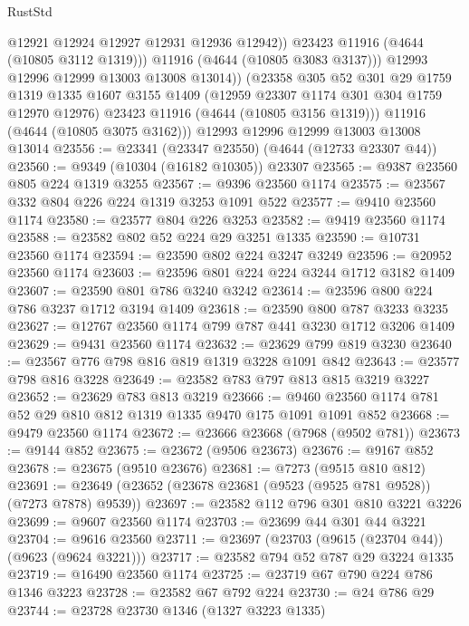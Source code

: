 \begin{lexlean}{RustStd}
\begin{coremodule}
                  @12921
                  @12924
                  @12927
                  @12931
                  @12936
                  @12942))
              @23423
              @11916
              (@4644 (@10805 @3112 @1319)))
            @11916
            (@4644 (@10805 @3083 @3137)))
          @12993
          @12996
          @12999
          @13003
          @13008
          @13014))
      (@23358
        @305
        @52
        @301
        @29
        @1759
        @1319
        @1335
        @1607
        @3155
        @1409
        (@12959 @23307 @1174 @301 @304 @1759 @12970 @12976)
        @23423
        @11916
        (@4644 (@10805 @3156 @1319)))
      @11916
      (@4644 (@10805 @3075 @3162)))
    @12993
    @12996
    @12999
    @13003
    @13008
    @13014
@23556 := @23341 (@23347 @23550) (@4644 (@12733 @23307 @44))
@23560 := @9349 (@10304 (@16182 @10305)) @23307
@23565 := @9387 @23560 @805 @224 @1319 @3255
@23567 := @9396 @23560 @1174
@23575 := @23567 @332 @804 @226 @224 @1319 @3253 @1091 @522
@23577 := @9410 @23560 @1174
@23580 := @23577 @804 @226 @3253
@23582 := @9419 @23560 @1174
@23588 := @23582 @802 @52 @224 @29 @3251 @1335
@23590 := @10731 @23560 @1174
@23594 := @23590 @802 @224 @3247 @3249
@23596 := @20952 @23560 @1174
@23603 := @23596 @801 @224 @224 @3244 @1712 @3182 @1409
@23607 := @23590 @801 @786 @3240 @3242
@23614 := @23596 @800 @224 @786 @3237 @1712 @3194 @1409
@23618 := @23590 @800 @787 @3233 @3235
@23627 := @12767 @23560 @1174 @799 @787 @441 @3230 @1712 @3206 @1409
@23629 := @9431 @23560 @1174
@23632 := @23629 @799 @819 @3230
@23640 := @23567 @776 @798 @816 @819 @1319 @3228 @1091 @842
@23643 := @23577 @798 @816 @3228
@23649 := @23582 @783 @797 @813 @815 @3219 @3227
@23652 := @23629 @783 @813 @3219
@23666 := @9460 @23560 @1174 @781 @52 @29 @810 @812 @1319 @1335 @9470 @175 @1091 @1091 @852
@23668 := @9479 @23560 @1174
@23672 := @23666 @23668 (@7968 (@9502 @781))
@23673 := @9144 @852
@23675 := @23672 (@9506 @23673)
@23676 := @9167 @852
@23678 := @23675 (@9510 @23676)
@23681 := @7273 (@9515 @810 @812)
@23691 := @23649 (@23652 (@23678 @23681 (@9523 (@9525 @781 @9528)) (@7273 @7878) @9539))
@23697 := @23582 @112 @796 @301 @810 @3221 @3226
@23699 := @9607 @23560 @1174
@23703 := @23699 @44 @301 @44 @3221
@23704 := @9616 @23560
@23711 := @23697 (@23703 (@9615 (@23704 @44)) (@9623 (@9624 @3221)))
@23717 := @23582 @794 @52 @787 @29 @3224 @1335
@23719 := @16490 @23560 @1174
@23725 := @23719 @67 @790 @224 @786 @1346 @3223
@23728 := @23582 @67 @792 @224
@23730 := @24 @786 @29
@23744 := @23728
    @23730
    @1346
    (@1327 @3223 @1335)

\end{coremodule}
\end{lexlean}

